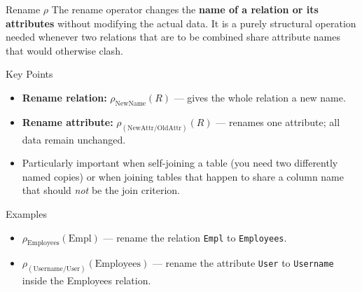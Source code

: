 \begin{frame}{Rename $\rho$}
  The rename operator changes the \textbf{name of a relation or its
  attributes} without modifying the actual data.  It is a purely
  structural operation needed whenever two relations that are to be
  combined share attribute names that would otherwise clash.

  \begin{block}{Key Points}
    \begin{itemize}
      \item \textbf{Rename relation:}
            $\rho_{\text{NewName}}(R)$ — gives the whole relation a new
            name.
      \item \textbf{Rename attribute:}
            $\rho_{(\text{NewAttr}/\text{OldAttr})}(R)$ — renames one
            attribute; all data remain unchanged.
      \item Particularly important when self-joining a table (you need two
            differently named copies) or when joining tables that happen to
            share a column name that should \emph{not} be the join
            criterion.
    \end{itemize}
  \end{block}

  \begin{examples}{Examples}
    \begin{itemize}
      \item $\rho_{\text{Employees}}(\text{Empl})$ — rename the relation
            \texttt{Empl} to \texttt{Employees}.
      \item $\rho_{(\text{Username}/\text{User})}(\text{Employees})$ —
            rename the attribute \texttt{User} to \texttt{Username} inside
            the Employees relation.
    \end{itemize}
  \end{examples}
\end{frame}

